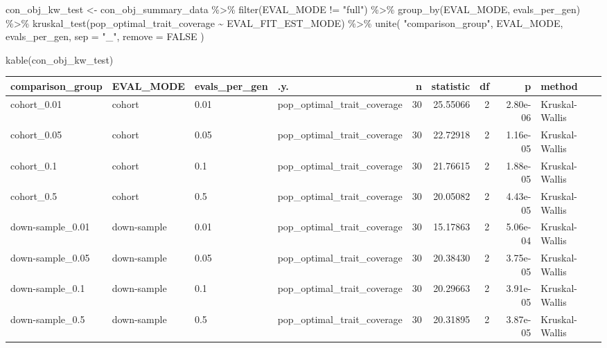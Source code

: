 \documentclass[
]{book}
\newenvironment{Shaded}{\begin{snugshade}}{\end{snugshade}}
\newcommand{\AttributeTok}[1]{\textcolor[rgb]{0.77,0.63,0.00}{#1}}
\newcommand{\ConstantTok}[1]{\textcolor[rgb]{0.00,0.00,0.00}{#1}}
\newcommand{\FunctionTok}[1]{\textcolor[rgb]{0.00,0.00,0.00}{#1}}
\newcommand{\NormalTok}[1]{#1}
\newcommand{\OtherTok}[1]{\textcolor[rgb]{0.56,0.35,0.01}{#1}}
\newcommand{\SpecialCharTok}[1]{\textcolor[rgb]{0.00,0.00,0.00}{#1}}
\newcommand{\StringTok}[1]{\textcolor[rgb]{0.31,0.60,0.02}{#1}}
\begin{document}
\begin{Shaded}
\begin{Highlighting}[]
\NormalTok{con\_obj\_kw\_test }\OtherTok{\textless{}{-}}\NormalTok{ con\_obj\_summary\_data }\SpecialCharTok{\%\textgreater{}\%}
  \FunctionTok{filter}\NormalTok{(EVAL\_MODE }\SpecialCharTok{!=} \StringTok{"full"}\NormalTok{) }\SpecialCharTok{\%\textgreater{}\%}
  \FunctionTok{group\_by}\NormalTok{(EVAL\_MODE, evals\_per\_gen) }\SpecialCharTok{\%\textgreater{}\%}
  \FunctionTok{kruskal\_test}\NormalTok{(pop\_optimal\_trait\_coverage }\SpecialCharTok{\textasciitilde{}}\NormalTok{ EVAL\_FIT\_EST\_MODE) }\SpecialCharTok{\%\textgreater{}\%}
  \FunctionTok{unite}\NormalTok{(}
    \StringTok{"comparison\_group"}\NormalTok{,}
\NormalTok{    EVAL\_MODE,}
\NormalTok{    evals\_per\_gen,}
    \AttributeTok{sep =} \StringTok{"\_"}\NormalTok{,}
    \AttributeTok{remove =} \ConstantTok{FALSE}
\NormalTok{  )}

\FunctionTok{kable}\NormalTok{(con\_obj\_kw\_test)}
\end{Highlighting}
\end{Shaded}

\begin{tabular}{l|l|l|l|r|r|r|r|l}
\hline
comparison\_group & EVAL\_MODE & evals\_per\_gen & .y. & n & statistic & df & p & method\\
\hline
cohort\_0.01 & cohort & 0.01 & pop\_optimal\_trait\_coverage & 30 & 25.55066 & 2 & 2.80e-06 & Kruskal-Wallis\\
\hline
cohort\_0.05 & cohort & 0.05 & pop\_optimal\_trait\_coverage & 30 & 22.72918 & 2 & 1.16e-05 & Kruskal-Wallis\\
\hline
cohort\_0.1 & cohort & 0.1 & pop\_optimal\_trait\_coverage & 30 & 21.76615 & 2 & 1.88e-05 & Kruskal-Wallis\\
\hline
cohort\_0.5 & cohort & 0.5 & pop\_optimal\_trait\_coverage & 30 & 20.05082 & 2 & 4.43e-05 & Kruskal-Wallis\\
\hline
down-sample\_0.01 & down-sample & 0.01 & pop\_optimal\_trait\_coverage & 30 & 15.17863 & 2 & 5.06e-04 & Kruskal-Wallis\\
\hline
down-sample\_0.05 & down-sample & 0.05 & pop\_optimal\_trait\_coverage & 30 & 20.38430 & 2 & 3.75e-05 & Kruskal-Wallis\\
\hline
down-sample\_0.1 & down-sample & 0.1 & pop\_optimal\_trait\_coverage & 30 & 20.29663 & 2 & 3.91e-05 & Kruskal-Wallis\\
\hline
down-sample\_0.5 & down-sample & 0.5 & pop\_optimal\_trait\_coverage & 30 & 20.31895 & 2 & 3.87e-05 & Kruskal-Wallis\\
\hline
\end{tabular}
\end{document}
